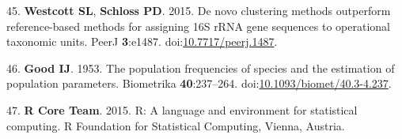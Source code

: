 \documentclass[11pt,]{article}
\begin{document}
\hypertarget{ref-Westcott2015}{}
45. \textbf{Westcott SL}, \textbf{Schloss PD}. 2015. De novo clustering
methods outperform reference-based methods for assigning 16S rRNA gene
sequences to operational taxonomic units. PeerJ \textbf{3}:e1487.
doi:\href{https://doi.org/10.7717/peerj.1487}{10.7717/peerj.1487}.

\hypertarget{ref-Good1953}{}
46. \textbf{Good IJ}. 1953. The population frequencies of species and
the estimation of population parameters. Biometrika
\textbf{40}:237--264.
doi:\href{https://doi.org/10.1093/biomet/40.3-4.237}{10.1093/biomet/40.3-4.237}.

\hypertarget{ref-language2015}{}
47. \textbf{R Core Team}. 2015. R: A language and environment for
statistical computing. R Foundation for Statistical Computing, Vienna,
Austria.
\end{document}
